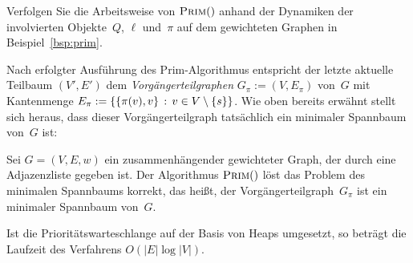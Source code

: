 \begin{aufg}
Verfolgen Sie die Arbeitsweise von $\mathop{\text{\textsc{Prim}}}()$ anhand der Dynamiken der involvierten Objekte~$Q$, $\ell$ und~$\pi$ auf dem gewichteten Graphen in Beispiel~\ref{bsp:prim}.
\end{aufg}

\begin{bem}
Nach erfolgter Ausführung des Prim-Algorithmus entspricht der letzte aktuelle Teilbaum $(V',E')$ dem \emph{Vorgängerteilgraphen} $G_\pi := (V,E_\pi)$ von~$G$ mit Kantenmenge $E_\pi := \left\{  \{\pi(v),v\} \,:\, v \in V \setminus \{s\} \right\}$.
Wie oben bereits erwähnt stellt sich heraus, dass dieser Vorgängerteilgraph tatsächlich ein minimaler Spannbaum von~$G$ ist:
\end{bem} 

\begin{thm}
\label{thm:prim-korrektheit}
Sei $G=(V,E,w)$ ein zusammenhängender gewichteter Graph, der durch eine Adjazenzliste gegeben ist. 
Der Algorithmus $\mathop{\text{\textsc{Prim}}}()$ löst das Problem des minimalen Spannbaums korrekt, das heißt, der Vorgängerteilgraph~$G_\pi$ ist ein minimaler Spannbaum von~$G$.

Ist die Prioritätswarteschlange auf der Basis von Heaps umgesetzt, so beträgt die Laufzeit des Verfahrens $O(|E| \log |V|)$. 
\end{thm}

